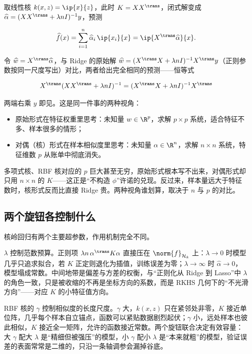 取线性核 \(k(x,z)=\ip{x}{z}\)，此时 \(K=XX^{\trans}\)，闭式解变成 \(\widehat\alpha=(XX^{\trans}+\lambda nI)^{-1}y\)，预测

\[
\widehat f(x)=\sum_{i=1}^{n}\widehat\alpha_i\,\ip{x_i}{x}
=\ip{X^{\trans}\widehat\alpha}{x}.
\]

令 \(\widehat w=X^{\trans}\widehat\alpha\)，与 Ridge 的原始解 \(\widehat w=(X^{\trans}X+\lambda nI)^{-1}X^{\trans}y\)（正则参数按同一尺度写出）对比，两者给出完全相同的预测——恒等式

\[
X^{\trans}(XX^{\trans}+\lambda nI)^{-1}
=(X^{\trans}X+\lambda nI)^{-1}X^{\trans}
\]

两端右乘 \(y\) 即见。这是同一件事的两种视角：

\begin{itemize}
\tightlist
\item
  原始形式在特征权重里思考：未知量 \(w\in\R^{p}\)，求解 \(p\times p\) 系统，适合特征不多、样本很多的情形；
\item
  对偶（核）形式在样本相似度里思考：未知量 \(\alpha\in\R^{n}\)，求解 \(n\times n\) 系统，特征维数 \(p\) 从账单中彻底消失。
\end{itemize}

多项式核、RBF 核对应的 \(p\) 巨大甚至无穷，原始形式根本写不出来，对偶形式却只用 \(n\times n\) 的 \(K\)——这正是``不构造 \(\phi\)''许诺的兑现。反过来，样本量远大于特征数时，核形式反而比直接 Ridge 贵。两种视角谁划算，取决于 \(n\) 与 \(p\) 的对比。

\subsection{两个旋钮各控制什么}

核岭回归有两个主要超参数，作用机制完全不同。

\(\lambda\) 控制范数预算。正则项 \(\lambda n\,\alpha^{\trans}K\alpha\) 直接压在 \(\norm{f}_{\mathcal{H}_k}\) 上：\(\lambda\to0\) 时模型几乎只追求拟合，若 \(K\) 正定则退化为插值，训练误差为零；\(\lambda\to\infty\) 时 \(\widehat\alpha\to0\)，模型塌成常数。中间地带是偏差与方差的权衡，与``正则化从 Ridge 到 Lasso''中 \(\lambda\) 的角色一致，只是被收缩的不再是坐标方向的系数，而是 RKHS 几何下的``不光滑方向''——对应 \(K\) 的小特征值方向。

RBF 核的 \(\gamma\) 控制相似度的长度尺度。\(\gamma\) 大，\(k(x,z)\) 只在紧邻处非零，\(K\) 接近单位阵，几乎每个样本自立锚点，函数可以紧贴数据剧烈起伏；\(\gamma\) 小，远处样本也彼此相似，\(K\) 接近全一矩阵，允许的函数接近常数。两个旋钮联合决定有效容量：大 \(\gamma\) 配大 \(\lambda\) 是``精细但被强压''的模型，小 \(\gamma\) 配小 \(\lambda\) 是``本来就粗''的模型，验证误差的表面常常是二维的，只沿一条轴调参会漏掉谷底。

